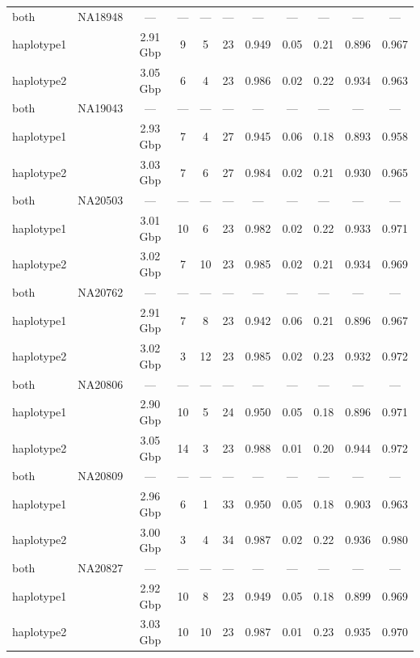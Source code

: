 \begin{table}[t]
\begin{tabular*}{0.9\linewidth}{@{\extracolsep{\fill}}l|lccccccccc}
both & {NA18948} & {—} & {—} & {—} & {—} & {—} & {—} & {—} & {—} & {—} \\ 
haplotype1 &  & 2.91 Gbp & 9 & 5 & 23 & 0.949 & 0.05 & 0.21 & 0.896 & 0.967 \\ 
haplotype2 &  & 3.05 Gbp & 6 & 4 & 23 & 0.986 & 0.02 & 0.22 & 0.934 & 0.963 \\ 
both & {NA19043} & {—} & {—} & {—} & {—} & {—} & {—} & {—} & {—} & {—} \\ 
haplotype1 &  & 2.93 Gbp & 7 & 4 & 27 & 0.945 & 0.06 & 0.18 & 0.893 & 0.958 \\ 
haplotype2 &  & 3.03 Gbp & 7 & 6 & 27 & 0.984 & 0.02 & 0.21 & 0.930 & 0.965 \\ 
both & {NA20503} & {—} & {—} & {—} & {—} & {—} & {—} & {—} & {—} & {—} \\ 
haplotype1 &  & 3.01 Gbp & 10 & 6 & 23 & 0.982 & 0.02 & 0.22 & 0.933 & 0.971 \\ 
haplotype2 &  & 3.02 Gbp & 7 & 10 & 23 & 0.985 & 0.02 & 0.21 & 0.934 & 0.969 \\ 
both & {NA20762} & {—} & {—} & {—} & {—} & {—} & {—} & {—} & {—} & {—} \\ 
haplotype1 &  & 2.91 Gbp & 7 & 8 & 23 & 0.942 & 0.06 & 0.21 & 0.896 & 0.967 \\ 
haplotype2 &  & 3.02 Gbp & 3 & 12 & 23 & 0.985 & 0.02 & 0.23 & 0.932 & 0.972 \\ 
both & {NA20806} & {—} & {—} & {—} & {—} & {—} & {—} & {—} & {—} & {—} \\ 
haplotype1 &  & 2.90 Gbp & 10 & 5 & 24 & 0.950 & 0.05 & 0.18 & 0.896 & 0.971 \\ 
haplotype2 &  & 3.05 Gbp & 14 & 3 & 23 & 0.988 & 0.01 & 0.20 & 0.944 & 0.972 \\ 
both & {NA20809} & {—} & {—} & {—} & {—} & {—} & {—} & {—} & {—} & {—} \\ 
haplotype1 &  & 2.96 Gbp & 6 & 1 & 33 & 0.950 & 0.05 & 0.18 & 0.903 & 0.963 \\ 
haplotype2 &  & 3.00 Gbp & 3 & 4 & 34 & 0.987 & 0.02 & 0.22 & 0.936 & 0.980 \\ 
both & {NA20827} & {—} & {—} & {—} & {—} & {—} & {—} & {—} & {—} & {—} \\ 
haplotype1 &  & 2.92 Gbp & 10 & 8 & 23 & 0.949 & 0.05 & 0.18 & 0.899 & 0.969 \\ 
haplotype2 &  & 3.03 Gbp & 10 & 10 & 23 & 0.987 & 0.01 & 0.23 & 0.935 & 0.970 \\ 
\bottomrule
\end{tabular*}
\end{table}


